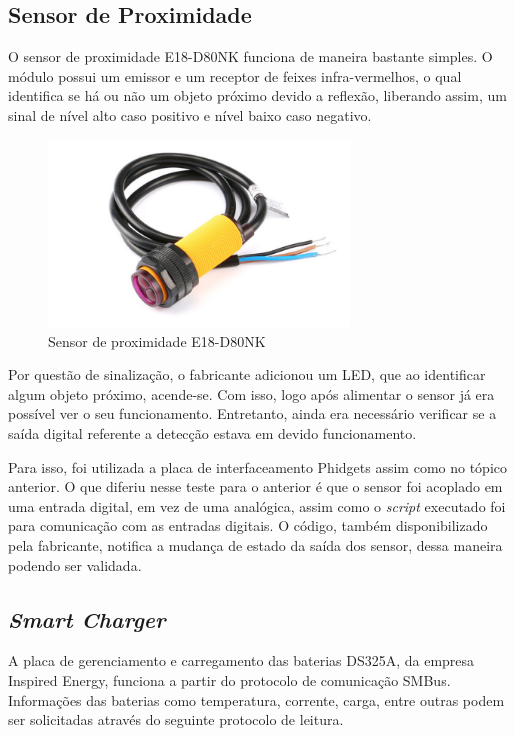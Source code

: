 	\subsection{Sensor de Proximidade}
		O sensor de proximidade E18-D80NK funciona de maneira bastante simples. O módulo possui um emissor e um receptor de feixes infra-vermelhos, o qual identifica se há ou não um objeto próximo devido a reflexão, liberando assim, um sinal de nível alto caso positivo e nível baixo caso negativo.
		
		\begin{figure}[!ht]
		   \centering
		   \includegraphics[width=8cm]{Figures/proximity_sensor.jpg}
		   \caption{Sensor de proximidade E18-D80NK}
		   \label{fig:E18-D80NK}
		\end{figure}
		
		Por questão de sinalização, o fabricante adicionou um LED, que ao identificar algum objeto próximo, acende-se. Com isso, logo após alimentar o sensor já era possível ver o seu funcionamento. Entretanto, ainda era necessário verificar se a saída digital referente a detecção estava em devido funcionamento.
		
		Para isso, foi utilizada a placa de interfaceamento Phidgets assim como no tópico anterior. O que diferiu nesse teste para o anterior é que o sensor foi acoplado em uma entrada digital, em vez de uma analógica, assim como o \textit{script} executado foi para comunicação com as entradas digitais. O código, também disponibilizado pela fabricante, notifica a mudança de estado da saída dos sensor, dessa maneira podendo ser validada.
		
	\subsection{\textit{Smart Charger}}
    
	    A placa de gerenciamento e carregamento das baterias DS325A, da empresa Inspired Energy, funciona a partir do protocolo de comunicação SMBus. Informações das baterias como temperatura, corrente, carga, entre outras podem ser solicitadas através do seguinte protocolo de leitura.
	    
